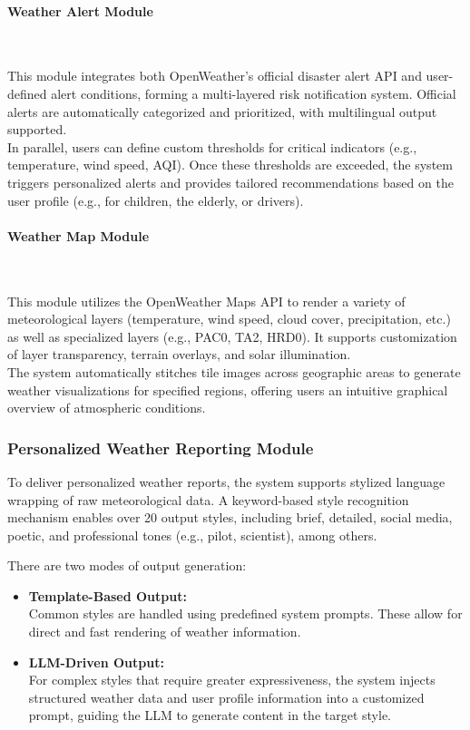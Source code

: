 \documentclass[final-report]{report-template}
\begin{document}
\paragraph{Weather Alert Module}~

This module integrates both OpenWeather’s official disaster alert API and user-defined alert conditions, forming a multi-layered risk notification system. Official alerts are automatically categorized and prioritized, with multilingual output supported. \\
In parallel, users can define custom thresholds for critical indicators (e.g., temperature, wind speed, AQI). Once these thresholds are exceeded, the system triggers personalized alerts and provides tailored recommendations based on the user profile (e.g., for children, the elderly, or drivers).

\paragraph{Weather Map Module}~

This module utilizes the OpenWeather Maps API to render a variety of meteorological layers (temperature, wind speed, cloud cover, precipitation, etc.) as well as specialized layers (e.g., PAC0, TA2, HRD0). It supports customization of layer transparency, terrain overlays, and solar illumination. \\
The system automatically stitches tile images across geographic areas to generate weather visualizations for specified regions, offering users an intuitive graphical overview of atmospheric conditions.

\subsubsection{Personalized Weather Reporting Module}

To deliver personalized weather reports, the system supports stylized language wrapping of raw meteorological data. A keyword-based style recognition mechanism enables over 20 output styles, including brief, detailed, social media, poetic, and professional tones (e.g., pilot, scientist), among others.

There are two modes of output generation:

\begin{itemize}
  \item \textbf{Template-Based Output:} \\
  Common styles are handled using predefined system prompts. These allow for direct and fast rendering of weather information.

  \item \textbf{LLM-Driven Output:} \\
  For complex styles that require greater expressiveness, the system injects structured weather data and user profile information into a customized prompt, guiding the LLM to generate content in the target style. \\
\end{itemize}
\end{document}
